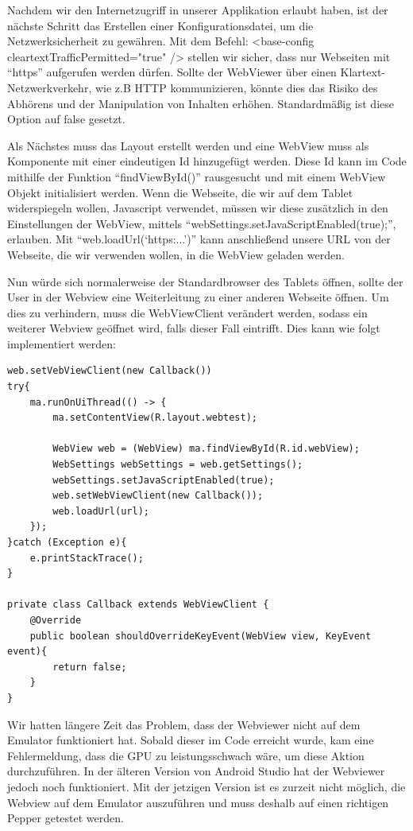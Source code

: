 Nachdem wir den Internetzugriff in unserer Applikation erlaubt haben, ist der nächste Schritt das Erstellen einer Konfigurationsdatei, um die Netzwerksicherheit zu gewähren.
Mit dem Befehl: <base-config cleartextTrafficPermitted="true" /> stellen wir sicher, dass nur Webseiten mit ``https'' aufgerufen werden dürfen. 
Sollte der WebViewer über einen Klartext-Netzwerkverkehr, wie z.B HTTP kommunizieren, könnte dies das Risiko des Abhörens und der Manipulation von Inhalten erhöhen. Standardmäßig ist diese Option auf false gesetzt. 
\cite{webview}

Als Nächstes muss das Layout erstellt werden und eine WebView muss als Komponente mit einer eindeutigen Id hinzugefügt werden. Diese Id kann im 
Code mithilfe der Funktion ``findViewById()'' rausgesucht und mit einem WebView Objekt initialisiert werden. Wenn die Webseite, die wir 
auf dem Tablet widerspiegeln wollen, Javascript verwendet, müssen wir diese zusätzlich in den Einstellungen der WebView, mittels 
``webSettings.setJavaScriptEnabled(true);'', erlauben. Mit ``web.loadUrl(‘https:...’)'' kann anschließend unsere URL von der 
Webseite, die wir verwenden wollen, in die WebView geladen werden. 


Nun würde sich normalerweise der Standardbrowser des Tablets öffnen, sollte der User in der Webview eine Weiterleitung zu einer anderen Webseite 
öffnen. Um dies zu verhindern, muss die WebViewClient verändert werden, sodass ein weiterer Webview geöffnet wird, falls dieser Fall eintrifft. 
Dies kann wie folgt implementiert werden: 

\begin{lstlisting}
web.setVebViewClient(new Callback())
try{
    ma.runOnUiThread(() -> {
        ma.setContentView(R.layout.webtest);

        WebView web = (WebView) ma.findViewById(R.id.webView);
        WebSettings webSettings = web.getSettings();
        webSettings.setJavaScriptEnabled(true);
        web.setWebViewClient(new Callback());
        web.loadUrl(url);
    });
}catch (Exception e){
    e.printStackTrace();
}

private class Callback extends WebViewClient {
    @Override
    public boolean shouldOverrideKeyEvent(WebView view, KeyEvent event){
        return false;
    }
}
\end{lstlisting}
Wir hatten längere Zeit das Problem, dass der Webviewer nicht auf dem Emulator funktioniert hat. Sobald dieser im Code erreicht wurde, kam eine 
Fehlermeldung, dass die GPU zu leistungsschwach wäre, um diese Aktion durchzuführen. In der älteren Version von Android Studio hat der Webviewer 
jedoch noch funktioniert. 
Mit der jetzigen Version ist es zurzeit nicht möglich, die Webview auf dem Emulator auszuführen und muss deshalb auf einen richtigen Pepper 
getestet werden.

